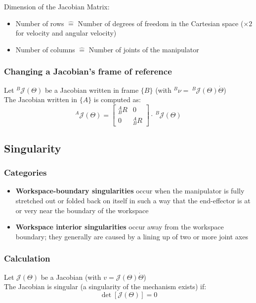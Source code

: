 \documentclass[10pt,a4paper]{article}
\begin{document}
Dimension of the Jacobian Matrix:
\begin{itemize}
	\item Number of rows $\hat{=}$ Number of degrees of freedom in the Cartesian space ($\times 2$ for velocity and angular velocity)
	\item Number of columns $\hat{=}$ Number of joints of the manipulator
\end{itemize}

\subsubsection{Changing a Jacobian's frame of reference}
Let $^B\mathcal{J}(\Theta)$ be a Jacobian written in frame $\{B\}$ (with $^B\nu  = ~^B\mathcal{J}(\Theta)\dot \Theta$)\\
The Jacobian written in $\{A\}$ is computed as: \\
$$
^A\mathcal{J}(\Theta) = \left[\begin{array}{c|c}
^A_BR & 0 \\
\hline
0 & ^A_BR
\end{array}\right] ⋅ ~^B\mathcal{J}(\Theta)
$$

\subsection{Singularity}
\subsubsection{Categories}
\begin{itemize}
	\item \textbf{Workspace-boundary singularities} occur when the manipulator is fully stretched out or folded back on itself in such a way that the end-effector is at or very near the boundary of the workspace
	\item \textbf{Workspace interior singularities} occur away from the workspace boundary; they generally are caused by a lining up of two or more joint axes
\end{itemize}

\subsubsection{Calculation}
Let $\mathcal{J}(\Theta)$ be a Jacobian (with $v  = \mathcal{J}(\Theta)\dot \Theta$)\\
The Jacobian is singular (a singularity of the mechanism exists) if: \\
$$
\det[\mathcal{J}(\Theta)] = 0
$$
\end{document}
